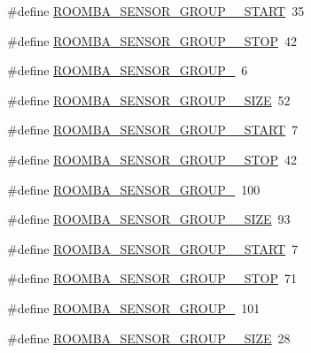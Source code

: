 \begin{DoxyCompactItemize}
\item 
\#define \hyperlink{group__roomba__sensor__group_ga08860f258b4fdca4fcfb4e1777a46e78}{R\-O\-O\-M\-B\-A\-\_\-\-S\-E\-N\-S\-O\-R\-\_\-\-G\-R\-O\-U\-P\-\_\-\_\-\-S\-T\-A\-R\-T}~35
\item 
\#define \hyperlink{group__roomba__sensor__group_ga0fbbe29bfc4a6b811907c63037152957}{R\-O\-O\-M\-B\-A\-\_\-\-S\-E\-N\-S\-O\-R\-\_\-\-G\-R\-O\-U\-P\-\_\-\_\-\-S\-T\-O\-P}~42
\item 
\#define \hyperlink{group__roomba__sensor__group_ga499cb0407da4e5ca807a2a3b46010e7a}{R\-O\-O\-M\-B\-A\-\_\-\-S\-E\-N\-S\-O\-R\-\_\-\-G\-R\-O\-U\-P\-\_}~6
\item 
\#define \hyperlink{group__roomba__sensor__group_gae2eb5f26db89231034d7e55ca4656d1f}{R\-O\-O\-M\-B\-A\-\_\-\-S\-E\-N\-S\-O\-R\-\_\-\-G\-R\-O\-U\-P\-\_\-\_\-\-S\-I\-Z\-E}~52
\item 
\#define \hyperlink{group__roomba__sensor__group_gaf2d303f7f37e41373c876adee8db9d43}{R\-O\-O\-M\-B\-A\-\_\-\-S\-E\-N\-S\-O\-R\-\_\-\-G\-R\-O\-U\-P\-\_\-\_\-\-S\-T\-A\-R\-T}~7
\item 
\#define \hyperlink{group__roomba__sensor__group_ga9cfca0f2cbbbcdc82af10f9fbb60d440}{R\-O\-O\-M\-B\-A\-\_\-\-S\-E\-N\-S\-O\-R\-\_\-\-G\-R\-O\-U\-P\-\_\-\_\-\-S\-T\-O\-P}~42
\item 
\#define \hyperlink{group__roomba__sensor__group_ga7f009c7382f552989be953ba6fefdb54}{R\-O\-O\-M\-B\-A\-\_\-\-S\-E\-N\-S\-O\-R\-\_\-\-G\-R\-O\-U\-P\-\_}~100
\item 
\#define \hyperlink{group__roomba__sensor__group_ga40b8003d68cb76448bed3689c2351b7a}{R\-O\-O\-M\-B\-A\-\_\-\-S\-E\-N\-S\-O\-R\-\_\-\-G\-R\-O\-U\-P\-\_\-\_\-\-S\-I\-Z\-E}~93
\item 
\#define \hyperlink{group__roomba__sensor__group_gab34012c2bb0d979b8e2b0cf13dbcac75}{R\-O\-O\-M\-B\-A\-\_\-\-S\-E\-N\-S\-O\-R\-\_\-\-G\-R\-O\-U\-P\-\_\-\_\-\-S\-T\-A\-R\-T}~7
\item 
\#define \hyperlink{group__roomba__sensor__group_ga7aa408f14c5e440472a1d50d5d94c1bd}{R\-O\-O\-M\-B\-A\-\_\-\-S\-E\-N\-S\-O\-R\-\_\-\-G\-R\-O\-U\-P\-\_\-\_\-\-S\-T\-O\-P}~71
\item 
\#define \hyperlink{group__roomba__sensor__group_gac5e76f90edbe17f9f1a51514c9137a3c}{R\-O\-O\-M\-B\-A\-\_\-\-S\-E\-N\-S\-O\-R\-\_\-\-G\-R\-O\-U\-P\-\_}~101
\item 
\#define \hyperlink{group__roomba__sensor__group_ga40e7b655a97868ad2821671735733261}{R\-O\-O\-M\-B\-A\-\_\-\-S\-E\-N\-S\-O\-R\-\_\-\-G\-R\-O\-U\-P\-\_\-\_\-\-S\-I\-Z\-E}~28

\end{DoxyCompactItemize}
